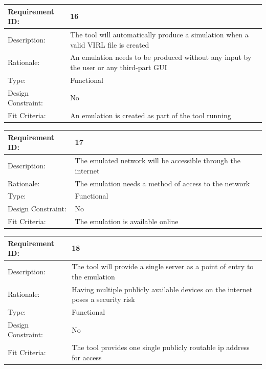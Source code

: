 \documentclass[11pt]{report}
\begin{document}
\newline
\vspace*{0.5 cm}
\newline
\begin{tabular}{|l|p{12cm}|}
	\hline Requirement ID: & 16 \\ 
	\hline Description: & The tool will automatically produce a simulation when a valid VIRL file is created  \\ 
	\hline Rationale: & An emulation needs to be produced without any input by the user or any third-part GUI \\ 
	\hline Type: & Functional \\ 
	\hline Design Constraint: & No \\ 
	\hline Fit Criteria: & An emulation is created as part of the tool running  \\ 
	\hline 
\end{tabular}
\newline
\vspace*{0.5 cm}
\newline
\begin{tabular}{|l|p{12cm}|}
	\hline Requirement ID: & 17 \\ 
	\hline Description: & The emulated network will be accessible through the internet  \\ 
	\hline Rationale: & The emulation needs a method of access to the network \\ 
	\hline Type: & Functional \\ 
	\hline Design Constraint: & No \\ 
	\hline Fit Criteria: & The emulation is available online  \\ 
	\hline 
\end{tabular}
\newline
\vspace*{0.5 cm}
\newline
\begin{tabular}{|l|p{12cm}|}
	\hline Requirement ID: & 18 \\ 
	\hline Description: & The tool will provide a single server as a point of entry to the emulation  \\ 
	\hline Rationale: & Having multiple publicly available devices on the internet poses a security risk \\ 
	\hline Type: & Functional \\ 
	\hline Design Constraint: & No \\ 
	\hline Fit Criteria: & The tool provides one single publicly routable ip address for access  \\ 
	\hline 
\end{tabular}
\end{document}
